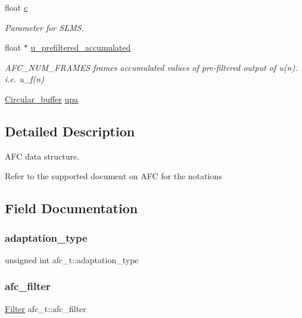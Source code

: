 \begin{DoxyCompactItemize}
float \mbox{\hyperlink{structafc__t_a7f14ee40f9a80693b671c16c526cf846}{c}}
\begin{DoxyCompactList}\small\item\em Parameter for S\+L\+MS. \end{DoxyCompactList}\item 
float $\ast$ \mbox{\hyperlink{structafc__t_af7b50d899dcdfc8c68f6866764861f5f}{u\+\_\+prefiltered\+\_\+accumulated}}
\begin{DoxyCompactList}\small\item\em A\+F\+C\+\_\+\+N\+U\+M\+\_\+\+F\+R\+A\+M\+ES frames accumulated values of pre-\/filtered output of u(n). i.\+e. u\+\_\+f(n) \end{DoxyCompactList}\item 
\mbox{\hyperlink{circular__buffer_8h_aa88184dd60879f696cb2e679d0e50b45}{Circular\+\_\+buffer}} \mbox{\hyperlink{structafc__t_a11328ef1f3d92c69c404c5df7761116a}{upa}}
\end{DoxyCompactItemize}


\subsection{Detailed Description}
A\+FC data structure. 

Refer to the supported document on A\+FC for the notations 

\subsection{Field Documentation}
\mbox{\label{structafc__t_ad09604e56d2183c494456350cbb709ea}} 
\subsubsection{\texorpdfstring{adaptation\+\_\+type}{adaptation\_type}}
{\footnotesize\ttfamily unsigned int afc\+\_\+t\+::adaptation\+\_\+type}

\mbox{\label{structafc__t_a33db3fc1bf008116481e632f6080972c}} 
\subsubsection{\texorpdfstring{afc\+\_\+filter}{afc\_filter}}
{\footnotesize\ttfamily \mbox{\hyperlink{filter_8h_a69e34b8aa259d2ca0b81b5c95f395bdf}{Filter}} afc\+\_\+t\+::afc\+\_\+filter}



